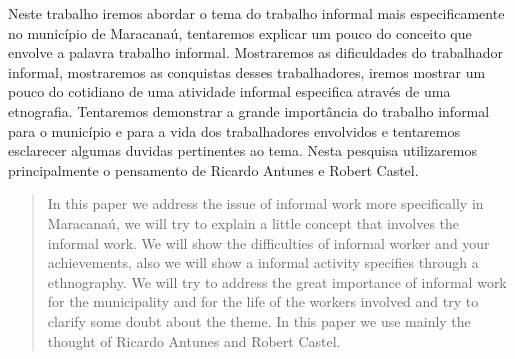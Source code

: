 \begin{resumo}
Neste trabalho iremos abordar o tema do trabalho informal mais especificamente 
no município de Maracanaú, tentaremos explicar um pouco do conceito que envolve 
a palavra trabalho informal. Mostraremos as dificuldades do trabalhador 
informal, mostraremos as conquistas desses trabalhadores, iremos mostrar um 
pouco do cotidiano de uma atividade informal especifica através de uma 
etnografia. Tentaremos demonstrar a grande importância do trabalho informal para 
o município e para a vida dos trabalhadores envolvidos e tentaremos esclarecer 
algumas duvidas pertinentes ao tema. Nesta pesquisa utilizaremos principalmente 
o pensamento de Ricardo Antunes e Robert Castel. 

\palavraschave
\end{resumo}
\pagebreak

\begin{abstract}
In this paper we address the issue of informal work more specifically
in Maracanaú, we will try to explain a little concept that involves
the informal work. We will show the difficulties of informal worker and your 
achievements, also we will show a informal activity specifies through a
ethnography. We will try to address the great importance of informal work for
the municipality and for the life of the workers involved and try to clarify
some doubt about the theme. In this paper we use mainly
the thought of Ricardo Antunes and Robert Castel.

\keywords
\end{abstract}
